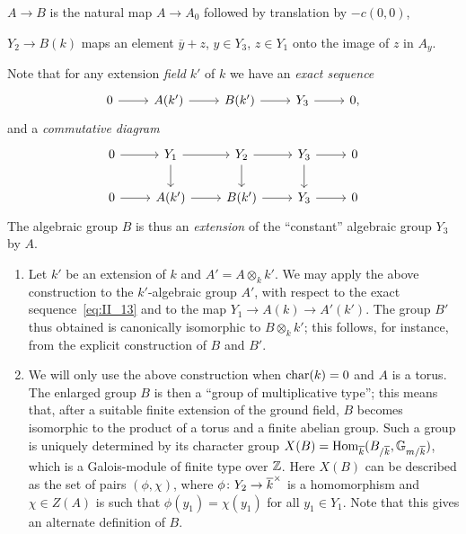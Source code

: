 $A \to B$ is the natural map $A \to A_0$ followed by translation by $- c(0,0)$,

$Y_2 \to B(k)$ maps an element $\overline{y} + z$, $y \in Y_3$, $z \in Y_1$ 
onto the image of $z$ in $A_y$.

Note that for any extension \emph{field} $k'$ of $k$ we have an \emph{exact 
sequence}
\[
	\begin{tikzcd}
		0 \arrow[r] & A(k') \arrow[r] & B(k') \arrow[r] & Y_3 \arrow[r] & 0,
	\end{tikzcd}
\]
and a \emph{commutative diagram}
\dpage
\[
	\begin{tikzcd}
		0 \arrow[r] & Y_1 \arrow[r] \arrow[d] & Y_2 \arrow[r] \arrow[d] & Y_3 
		\arrow[r] \arrow[d] & 0 \\
		0 \arrow[r] & A(k') \arrow[r] & B(k') \arrow[r] & Y_3 \arrow[r] & 0
	\end{tikzcd}
\]
The algebraic group $B$ is thus an \emph{extension} of the ``constant'' algebraic group $Y_3$ by $A$.
\begin{obs}
\begin{enumerate}[wide]
	\item Let $k'$ be an extension of $k$ and $A' = A \otimes_k k'$. We may 
	apply the above construction to the $k'$-algebraic group $A'$, with respect 
	to the exact sequence~\eqref{eq:II_13} and to the map $Y_1 \to A(k) \to
	A'(k') $. The group $B'$ thus obtained is canonically isomorphic to $B
	\otimes_k k'$; this follows, for instance, from the explicit construction
	of $B$ and $B'$.
	
	\item We will only use the above construction when $\operatorname{char}(k) = 0$ and $A$ 
	is a torus. The enlarged group $B$ is then a ``group of multiplicative 
	type''; this means that, after a suitable finite extension of the ground 
	field, $B$ becomes isomorphic to the product of a torus and a finite 
	abelian group. Such a group is uniquely determined by its character group $X
(B) = \operatorname{Hom}_{\overline{k}} (B_{/\overline{k}}, \mathbb{G}_{m/\overline{k}})$, which is a 
	Galois-module of finite type over $\mathbb{Z}$. Here $X(B)$ can be described as the 
	set of pairs $(\phi, \chi)$, where $\phi \colon Y_2 \to
	{\overline{k}}^\times$ is a homomorphism and $\chi \in Z(A)$ is such that
	$\phi(y_1) = \chi(y_1)$ for all $y_1 \in Y_1$. Note that this gives an
	alternate definition of $B$. 
\end{enumerate}
\end{obs}

